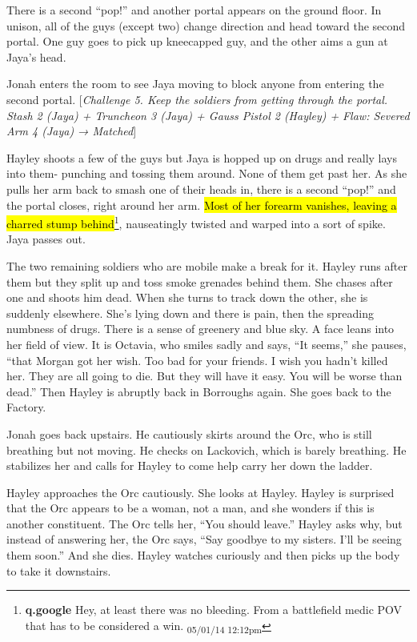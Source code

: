 There is a second ``pop!'' and another portal appears on the ground floor.  In unison, all of the guys (except two) change direction and head toward the second portal.  One guy goes to pick up kneecapped guy, and the other aims a gun at Jaya's head.



Jonah enters the room to see Jaya moving to block anyone from entering the second portal.  {[}\textit{Challenge 5.  Keep the soldiers from getting through the portal.  Stash 2 (Jaya) + Truncheon 3 (Jaya) + Gauss Pistol 2 (Hayley) + }\textit{ {\color[RGB]{255,0,0}Flaw: Severed Arm 4 (Jaya)} }\textit{ → Matched}{]}



Hayley shoots a few of the guys but Jaya is hopped up on drugs and really lays into them- punching and tossing them around.   None of them get past her.  As she pulls her arm back to smash one of their heads in, there is a second ``pop!'' and the portal closes, right around her arm.  \hl{Most of her forearm vanishes, leaving a charred stump behind}\footnote{\textbf{q.google }Hey, at least there was no bleeding.  From a battlefield medic POV that has to be considered a win. \textsubscript{05/01/14 12:12pm}}, nauseatingly twisted and warped into a sort of spike.  Jaya passes out.  



The two remaining soldiers who are mobile make a break for it.  Hayley runs after them but they split up and toss smoke grenades behind them.  She chases after one and shoots him dead.  When she turns to track down the other, she is suddenly elsewhere.  She's lying down and there is pain, then the spreading numbness of drugs.  There is a sense of greenery and blue sky.  A face leans into her field of view.  It is Octavia, who smiles sadly and says, ``It seems,'' she pauses, ``that Morgan got her wish.  Too bad for your friends.  I wish you hadn't killed her.  They are all going to die.  But they will have it easy.  You will be worse than dead.''  Then Hayley is abruptly back in Borroughs again.  She goes back to the Factory.



Jonah goes back upstairs.  He cautiously skirts around the Orc, who is still breathing but not moving.  He checks on Lackovich, which is barely breathing.  He stabilizes her and calls for Hayley to come help carry her down the ladder.



Hayley approaches the Orc cautiously.  She looks at Hayley.  Hayley is surprised that the Orc appears to be a woman, not a man, and she wonders if this is another constituent.  The Orc tells her, ``You should leave.''  Hayley asks why, but instead of answering her, the Orc says, ``Say goodbye to my sisters.  I'll be seeing them soon.''  And she dies.  Hayley watches curiously and then picks up the body to take it downstairs.



